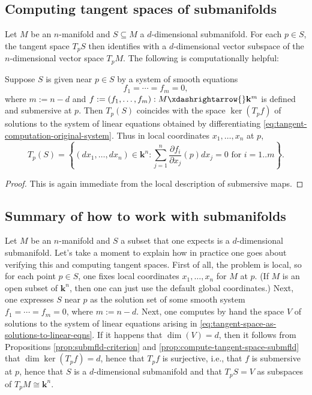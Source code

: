\documentclass[reqno]{amsart} 
\begin{document}
\subsection{Computing tangent spaces of submanifolds\label{sec:tangent-space-submfld}}
\label{sec:orgcf4ffee}
Let $M$ be an $n$-manifold and $S \subseteq M$
a $d$-dimensional submanifold.
For each $p \in S$,
the tangent space $T_p S$ then identifies with a $d$-dimensional vector
subspace of the $n$-dimensional vector space $T_p M$.
The following is computationally helpful:
\begin{proposition}\label{prop:compute-tangent-space-submfld}
  Suppose $S$
  is given near $p \in S$
  by a system of smooth equations
  \begin{equation}\label{eq:tangent-computation-original-system}
    f_1 = \dotsb = f_m = 0,
  \end{equation}
  where $m := n-d$ and $f := (f_1,\dotsc,f_m) : M \xdashrightarrow{}
  \mathbf{k}^m$
  is defined and submersive at $p$.
  Then $T_p(S)$ coincides with the space
  $\ker(T_p f)$
  of solutions to the system of linear
  equations obtained by differentiating
  \eqref{eq:tangent-computation-original-system}.
  Thus in local coordinates $x_1,\dotsc,x_n$
  at $p$,
  \begin{equation}\label{eq:tangent-space-as-solutions-to-linear-eqns}
    T_p(S)
    = 
    \left\{  (d x_1, \dotsc, d x_n) \in \mathbf{k}^n :
      \sum_{j=1}^{n}
      \frac{\partial f_i}{\partial x_j}(p) d x_j
      = 0 \text{ for } i=1..m
    \right\}.
  \end{equation}  
\end{proposition}
\begin{proof}
  This is again immediate from the local description
  of submersive maps.
\end{proof}

\subsection{Summary of how to work with submanifolds}
\label{sec:org75b7188}
Let $M$ be an $n$-manifold
and $S$ a subset that one expects is a $d$-dimensional submanifold.
Let's take a moment to explain how in practice one goes about
verifying this and computing tangent spaces.
First of all, the problem is local,
so for each point $p \in S$,
one fixes local coordinates
$x_1,\dotsc,x_n$ for $M$ at $p$.
(If $M$ is an open subset of $\mathbf{k}^n$, then one can just use
the default
global coordinates.)
Next,
one expresses $S$ near $p$
as the solution set of some smooth system $f_1 = \dotsb = f_m = 0$,
where $m := n - d$.
Next, one computes by hand the space $V$
of
solutions to the system of linear equations
arising in \eqref{eq:tangent-space-as-solutions-to-linear-eqns}.
If it happens that $\dim(V) = d$,
then it follows from Propositions \ref{prop:submfld-criterion} and \ref{prop:compute-tangent-space-submfld}
that $\dim \ker(T_p f) = d$,
hence that $T_p f$ is surjective, i.e.,
that $f$ is submersive at $p$,
hence that $S$ is a $d$-dimensional submanifold
and that $T_p S = V$
as subspaces of $T_p M \cong \mathbf{k}^n$.
\end{document}
